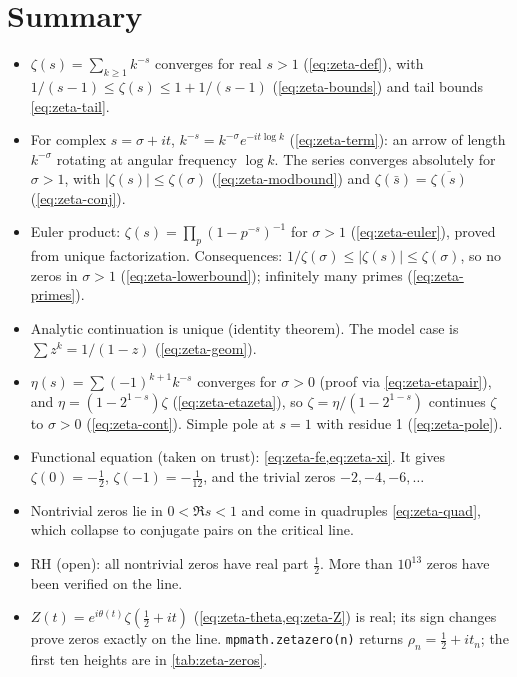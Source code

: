\section{Summary}\label{sec:zeta-summary}

\begin{itemize}
\item $\zeta(s)=\sum_{k\ge1}k^{-s}$ converges for real $s>1$ (\cref{eq:zeta-def}), with $1/(s-1)\le\zeta(s)\le1+1/(s-1)$ (\cref{eq:zeta-bounds}) and tail bounds \cref{eq:zeta-tail}.
\item For complex $s=\sigma+it$, $k^{-s}=k^{-\sigma}e^{-it\log k}$ (\cref{eq:zeta-term}): an arrow of length $k^{-\sigma}$ rotating at angular frequency $\log k$. The series converges absolutely for $\sigma>1$, with $|\zeta(s)|\le\zeta(\sigma)$ (\cref{eq:zeta-modbound}) and $\zeta(\bar s)=\overline{\zeta(s)}$ (\cref{eq:zeta-conj}).
\item Euler product: $\zeta(s)=\prod_p(1-p^{-s})^{-1}$ for $\sigma>1$ (\cref{eq:zeta-euler}), proved from unique factorization. Consequences: $1/\zeta(\sigma)\le|\zeta(s)|\le\zeta(\sigma)$, so no zeros in $\sigma>1$ (\cref{eq:zeta-lowerbound}); infinitely many primes (\cref{eq:zeta-primes}).
\item Analytic continuation is unique (identity theorem). The model case is $\sum z^k=1/(1-z)$ (\cref{eq:zeta-geom}).
\item $\eta(s)=\sum(-1)^{k+1}k^{-s}$ converges for $\sigma>0$ (proof via \cref{eq:zeta-etapair}), and $\eta=(1-2^{1-s})\zeta$ (\cref{eq:zeta-etazeta}), so $\zeta=\eta/(1-2^{1-s})$ continues $\zeta$ to $\sigma>0$ (\cref{eq:zeta-cont}). Simple pole at $s=1$ with residue 1 (\cref{eq:zeta-pole}).
\item Functional equation (taken on trust): \cref{eq:zeta-fe,eq:zeta-xi}. It gives $\zeta(0)=-\tfrac12$, $\zeta(-1)=-\tfrac1{12}$, and the trivial zeros $-2,-4,-6,\dots$
\item Nontrivial zeros lie in $0<\Re s<1$ and come in quadruples \cref{eq:zeta-quad}, which collapse to conjugate pairs on the critical line.
\item RH (open): all nontrivial zeros have real part $\tfrac12$. More than $10^{13}$ zeros have been verified on the line.
\item $Z(t)=e^{i\theta(t)}\zeta(\tfrac12+it)$ (\cref{eq:zeta-theta,eq:zeta-Z}) is real; its sign changes prove zeros exactly on the line. \texttt{mpmath.zetazero(n)} returns $\rho_n=\tfrac12+it_n$; the first ten heights are in \cref{tab:zeta-zeros}.
\end{itemize}

